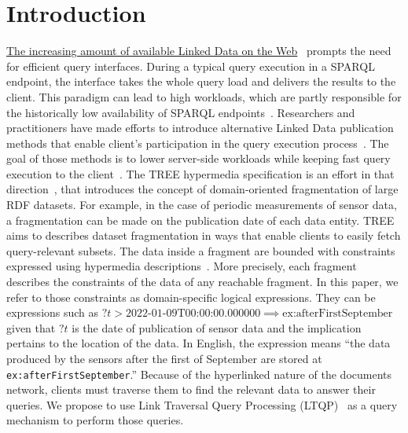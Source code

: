 \section{Introduction}



\href{https://lod-cloud.net/#diagram}{The increasing amount of available Linked Data on the Web}~\cite{Ermilov2013} prompts the need for efficient query interfaces.
During a typical query execution in a SPARQL endpoint, the interface takes the whole query load and delivers the results to the client.
This paradigm can lead to high workloads, which are partly responsible for the historically low availability of SPARQL endpoints~\cite{aranda2013}.
Researchers and practitioners have made efforts to introduce alternative Linked Data publication methods that enable client's participation in the query execution process~\cite{Verborgh2016TriplePF}.
The goal of those methods is to lower server-side workloads while keeping fast query execution to the client~\cite{Azzam2021}.
The TREE hypermedia specification is an effort in that direction~\cite{ColpaertMaterializedTREE, lancker2021LDS}, that introduces the concept of domain-oriented fragmentation of large RDF datasets.
For example, in the case of periodic measurements of sensor data, a fragmentation can be made on the publication date of each data entity.
TREE aims to describes dataset fragmentation in ways that enable clients to easily fetch query-relevant subsets.
The data inside a fragment are bounded with constraints expressed using hypermedia descriptions~\cite{thomasFieldingPhdThesis}.
More precisely, each fragment describes the constraints of the data of any reachable fragment.
In this paper, we refer to those constraints as domain-specific logical expressions.
They can be expressions such as $?t > \text{2022-01-09T00:00:00.000000} \implies \text{ex:afterFirstSeptember}$ given that $?t$ is the date of publication of sensor data and the implication pertains to the location of the data.
In English, the expression means ``the data produced by the sensors after the first of September are stored at \texttt{ex:afterFirstSeptember}.''
Because of the hyperlinked nature of the documents network, clients must traverse them to find the relevant data to answer their queries.
We propose to use Link Traversal Query Processing (LTQP)~\cite{Hartig2016} as a query mechanism to perform those queries.

